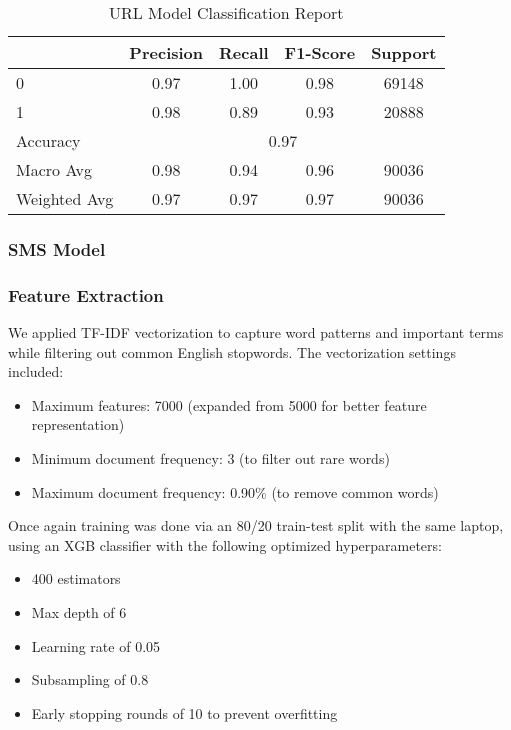 \documentclass{article}
\begin{document}
\begin{table}[htbp]
    \centering
    \caption{URL Model Classification Report}
    \begin{tabular}{l c c c c}
    \toprule
     & Precision & Recall & F1-Score & Support \\
    \midrule
    0 & 0.97 & 1.00 & 0.98 & 69148 \\
    1 & 0.98 & 0.89 & 0.93 & 20888 \\
    \midrule
    Accuracy & \multicolumn{4}{c}{0.97} \\
    Macro Avg & 0.98 & 0.94 & 0.96 & 90036 \\
    Weighted Avg & 0.97 & 0.97 & 0.97 & 90036 \\
    \bottomrule
    \end{tabular}
    \label{tab:classification_report}
\end{table}

\subsubsection{SMS Model}
\subsubsection*{Feature Extraction}

We applied TF-IDF vectorization to capture word patterns and important terms while filtering out common English stopwords. The vectorization settings included:

\begin{itemize}
    \item Maximum features: 7000 (expanded from 5000 for better feature representation)
    \item Minimum document frequency: 3 (to filter out rare words)
    \item Maximum document frequency: 0.90\% (to remove common words)
\end{itemize}

Once again training was done via an 80/20 train-test split with the same laptop, using an XGB classifier with the following optimized hyperparameters:

\begin{itemize}
    \item 400 estimators
    \item Max depth of 6
    \item Learning rate of 0.05
    \item Subsampling of 0.8
    \item Early stopping rounds of 10 to prevent overfitting
\end{itemize}
\end{document}
